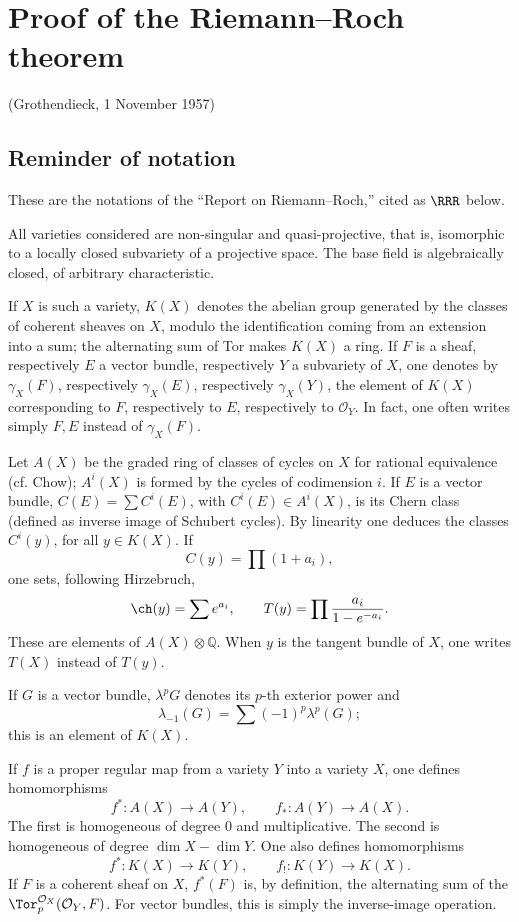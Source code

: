 \section*{Proof of the Riemann--Roch theorem}
\begin{center}
(Grothendieck, 1 November 1957)
\end{center}

\subsection*{Reminder of notation}
These are the notations of the ``Report on Riemann--Roch,'' cited as \(\RRR\) below.

All varieties considered are non-singular and quasi-projective, that is, isomorphic to a locally closed subvariety of a projective space. The base field is algebraically closed, of arbitrary characteristic.

If \(X\) is such a variety, \(K(X)\) denotes the abelian group generated by the classes of coherent sheaves on \(X\), modulo the identification coming from an extension into a sum; the alternating sum of Tor makes \(K(X)\) a ring. If \(F\) is a sheaf, respectively \(E\) a vector bundle, respectively \(Y\) a subvariety of \(X\), one denotes by \(\gamma_X(F)\), respectively \(\gamma_X(E)\), respectively \(\gamma_X(Y)\), the element of \(K(X)\) corresponding to \(F\), respectively to \(E\), respectively to \(\mathcal O_Y\). In fact, one often writes simply \(F,E\) instead of \(\gamma_X(F)\).

Let \(A(X)\) be the graded ring of classes of cycles on \(X\) for rational equivalence (cf. Chow); \(A^i(X)\) is formed by the cycles of codimension \(i\). If \(E\) is a vector bundle, \(C(E)=\sum C^i(E)\), with \(C^i(E)\in A^i(X)\), is its Chern class (defined as inverse image of Schubert cycles). By linearity one deduces the classes \(C^i(y)\), for all \(y\in K(X)\). If
\[
  C(y)=\prod (1+a_i),
\]
one sets, following Hirzebruch,
\[
  \ch(y)=\sum e^{a_i},\qquad
  T(y)=\prod\frac{a_i}{1-e^{-a_i}}.
\]
These are elements of \(A(X)\otimes\mathbb Q\). When \(y\) is the tangent bundle of \(X\), one writes \(T(X)\) instead of \(T(y)\).

If \(G\) is a vector bundle, \(\lambda^pG\) denotes its \(p\)-th exterior power and
\[
  \lambda_{-1}(G)=\sum(-1)^p\lambda^p(G);
\]
this is an element of \(K(X)\).

If \(f\) is a proper regular map from a variety \(Y\) into a variety \(X\), one defines homomorphisms
\[
  f^*:A(X)\longrightarrow A(Y),\qquad
  f_*:A(Y)\longrightarrow A(X).
\]
The first is homogeneous of degree \(0\) and multiplicative. The second is homogeneous of degree \(\dim X-\dim Y\). One also defines homomorphisms
\[
  f^*:K(X)\longrightarrow K(Y),\qquad
  f_!:K(Y)\longrightarrow K(X).
\]
If \(F\) is a coherent sheaf on \(X\), \(f^*(F)\) is, by definition, the alternating sum of the \(\Tor_p^{\mathcal O_X}(\mathcal O_Y,F)\). For vector bundles, this is simply the inverse-image operation.

